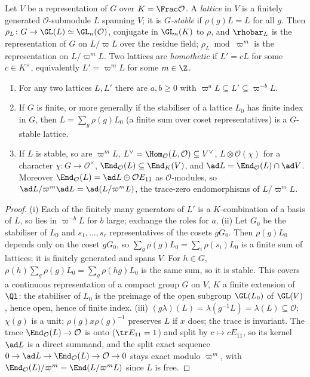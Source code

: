 \begin{definition}\label{def:reps:lattice}
Let $V$ be a representation of $G$ over $K=\Frac\mathcal{O}$. A \emph{lattice} in $V$ is a finitely generated $\mathcal{O}$-submodule $L$ spanning $V$; it is
\emph{$G$-stable} if $\rho(g)L=L$ for all $g$. Then $\rho_L\colon G\to\GL(L)\simeq\GL_n(\mathcal{O})$, conjugate in $\GL_n(K)$ to $\rho$, and $\rhobar_L$ is the representation of
$G$ on $L/\varpi L$ over the residue field; $\rho_L\bmod\varpi^m$ is the representation on $L/\varpi^mL$. Two lattices are \emph{homothetic} if $L'=cL$ for some
$c\in K^\times$, equivalently $L'=\varpi^mL$ for some $m\in\Z$.
\end{definition}

\begin{proposition}\label{prop:reps:lattice}
\begin{enumerate}[label=(\roman*)]
\item For any two lattices $L,L'$ there are $a,b\ge0$ with $\varpi^aL\subseteq L'\subseteq\varpi^{-b}L$.
\item If $G$ is finite, or more generally if the stabiliser of a lattice $L_0$ has finite index in $G$, then $L=\sum_g\rho(g)L_0$ (a finite sum over coset
representatives) is a $G$-stable lattice.
\item If $L$ is stable, so are $\varpi^mL$, $L^\vee=\Hom_\mathcal{O}(L,\mathcal{O})\subseteq V^\vee$, $L\otimes\mathcal{O}(\chi)$ for a character $\chi\colon G\to\mathcal{O}^\times$, $\End_\mathcal{O}(L)\subseteq\End_K(V)$,
and $\ad L=\End_\mathcal{O}(L)\cap\ad V$. Moreover $\End_\mathcal{O}(L)=\ad L\oplus\mathcal{O}E_{11}$ as $\mathcal{O}$-modules, so $\ad L/\varpi^m\ad L=\ad(L/\varpi^mL)$, the trace-zero endomorphisms
of $L/\varpi^mL$.
\end{enumerate}
\end{proposition}

\begin{proof}
(i) Each of the finitely many generators of $L'$ is a $K$-combination of a basis of $L$, so lies in $\varpi^{-b}L$ for $b$ large; exchange the roles for
$a$. (ii) Let $G_0$ be the stabiliser of $L_0$ and $s_1,\dots,s_r$ representatives of the cosets $gG_0$. Then $\rho(g)L_0$ depends only on the
coset $gG_0$, so $\sum_g\rho(g)L_0=\sum_i\rho(s_i)L_0$ is a finite sum of lattices; it is finitely generated and spans $V$. For $h\in G$,
$\rho(h)\sum_g\rho(g)L_0=\sum_g\rho(hg)L_0$ is the same sum, so it is stable. This covers a continuous representation of a compact group $G$ on
$V$, $K$ a finite extension of $\Ql$: the stabiliser of $L_0$ is the preimage of the open subgroup $\GL(L_0)$ of $\GL(V)$, hence open, hence of finite
index. (iii) $(g\lambda)(L)=\lambda(g^{-1}L)=\lambda(L)\subseteq\mathcal{O}$;
$\chi(g)$ is a unit; $\rho(g)x\rho(g)^{-1}$ preserves $L$ if $x$ does; the trace is invariant. The trace $\End_\mathcal{O}(L)\to\mathcal{O}$ is onto ($\tr E_{11}=1$) and split by
$c\mapsto cE_{11}$, so its kernel $\ad L$ is a direct summand, and the split exact sequence $0\to\ad L\to\End_\mathcal{O}(L)\to\mathcal{O}\to0$ stays exact modulo $\varpi^m$, with
$\End_\mathcal{O}(L)/\varpi^m=\End(L/\varpi^mL)$ since $L$ is free.
\end{proof}

